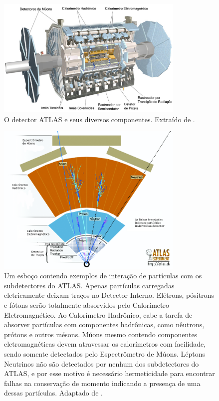 \begin{figure}[h!t]
\centering
\includegraphics[width=0.8\textwidth]{imagens/atlas_detector.png}
\caption[O detector ATLAS e seus diversos componentes]
{O detector ATLAS e seus diversos componentes. Extraído de
\cite{tese_torres}.}
\label{fig:det_atlas}
\end{figure}

\begin{figure}[h!t]
\centering
\includegraphics[width=0.8\textwidth]{imagens/particulas_subdetectores_3.png}
\caption[Esboço contendo exemplos de interação de partículas com os
subdetectores do ATLAS]
{Um esboço contendo exemplos de interação de partículas com os
subdetectores do ATLAS. 
Apenas partículas carregadas eletricamente deixam traços no Detector Interno. 
Elétrons, pósitrons e fótons serão totalmente absorvidos pelo Calorímetro 
Eletromagnético. Ao Calorímetro Hadrônico, cabe a tarefa de absorver 
partículas com componentes hadrônicas, como nêutrons, prótons e outros mésons. Múons
mesmo contendo componentes eletromagnéticas devem atravessar os calorímetros com
facilidade, sendo somente detectados pelo Espectrômetro de Múons. Léptons Neutrinos não
são detectados por nenhum dos subdetectores do ATLAS, e por esse motivo é
necessário hermeticidade para encontrar falhas na conservação de momento
indicando a presença de uma dessas partículas. Adaptado de \cite{particulas_atlas}.}
\label{fig:particulas_atlas}
\end{figure}

